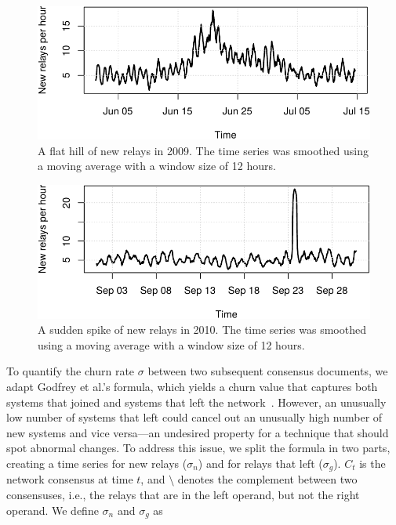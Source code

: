 \begin{figure}[t]
	\centering
	\includegraphics[width=\linewidth]{diagrams/flat-hill.pdf}
	\caption{A flat hill of new relays in 2009.  The time series was smoothed
	using a moving average with a window size of 12 hours.}
	\label{fig:flat-hill}
\end{figure}

\begin{figure}[t]
	\centering
	\includegraphics[width=\linewidth]{diagrams/sudden-spike.pdf}
	\caption{A sudden spike of new relays in 2010.  The time series was smoothed
	using a moving average with a window size of 12 hours.}
	\label{fig:sudden-spike}
\end{figure}

To quantify the churn rate $\sigma$ between two subsequent consensus documents,
we adapt Godfrey et al.'s formula, which yields a churn value that captures both
systems that joined and systems that left the network~\cite{Godfrey2006a}.
However, an unusually low number of systems that left could cancel out an
unusually high number of new systems and vice versa---an undesired property for
a technique that should spot abnormal changes.  To address this issue, we split
the formula in two parts, creating a time series for new relays ($\sigma_{n}$)
and for relays that left ($\sigma_{g}$).  $C_{t}$ is the network consensus at
time $t$, and $\setminus$ denotes the complement between two consensuses, i.e.,
the relays that are in the left operand, but not the right operand.  We define
$\sigma_{n}$ and $\sigma_{g}$ as

